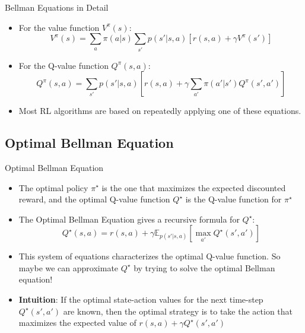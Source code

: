 \begin{frame}{Bellman Equations in Detail}
\begin{itemize}
    \item For the value function $V^{\pi}(s)$:
    $$
    V^{\pi}(s) = \sum_{a} \pi(a|s) \sum_{s'} p(s'|s,a) \left[ r(s,a) + \gamma V^{\pi}(s') \right]
    $$
    \item For the Q-value function $Q^{\pi}(s,a)$:
    $$
    Q^{\pi}(s,a) = \sum_{s'} p(s'|s,a) \left[ r(s,a) + \gamma \sum_{a'} \pi(a'|s') Q^{\pi}(s',a') \right]
    $$
    \item Most RL algorithms are based on repeatedly applying one of these equations.
\end{itemize}
\end{frame}

\subsection{Optimal Bellman Equation}
\begin{frame}{Optimal Bellman Equation}
\begin{itemize}
    \item The optimal policy $\pi^{\star}$ is the one that maximizes the expected discounted reward, and the optimal Q-value function $Q^{\star}$ is the Q-value function for $\pi^{\star}$
    \item The Optimal Bellman Equation gives a recursive formula for $Q^{\star}$:
    $$Q^{\star}(s,a) = r(s,a) + \gamma \mathbb{E}_{p(s'|s, a)}\left [\max_{a'} Q^{\star}(s',a') \right ]$$
    \item This system of equations characterizes the optimal Q-value function. So maybe we can approximate $Q^{\star}$ by trying to solve the optimal Bellman equation!
    \item \textbf{Intuition}: If the optimal state-action values for the next time-step $Q^{\star}(s',a')$ are known, then the optimal strategy is to take the action that maximizes the expected value of $r(s,a) + \gamma Q^{\star}(s',a')$
\end{itemize}
\end{frame}